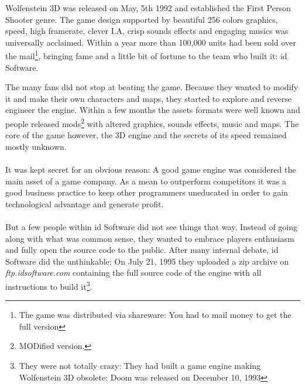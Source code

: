 Wolfenstein 3D was released on May, 5th 1992 and established the First Person Shooter genre. The game design supported by beautiful 256 colors graphics, speed, high framerate, clever I.A, crisp sounds effects and engaging musics was universally acclaimed. Within a year more than 100,000 units had been sold over the mail\footnote{The game was distributed via shareware: You had to mail money to get the full version}, bringing fame and a little bit of fortune to the team who built it: id Software.\\
\par
\begin{figure}[H]
\centering
{}
\end{figure}
\par
The many fans did not stop at beating the game. Because they wanted to modify it and make their own characters and maps, they started to explore and reverse engineer the engine. Within a few months the assets formats were well known and people released mods\footnote{MODified version.} with altered graphics, sounds effects, music and maps. The core of the game however, the 3D engine and the secrets of its speed remained mostly unknown.\\
\\
It was kept secret for an obvious reason: A good game engine was considered the main asset of a game company. As a mean to outperform competitors it was a good business practice to keep other programmers  uneducated in order to gain technological advantage and generate profit.\\
\\
But a few people within id Software did not see things that way. Instead of going along with what was common sense, they wanted to embrace players enthusiasm and fully open the source code to the public. After many internal debate, id Software did the unthinkable: On July 21, 1995 they uploaded a zip archive on \emph{ftp.idsoftware.com} containing the full source code of the engine with all instructions to build it\footnote{They were not totally crazy: They had built a game engine making Wolfenstein 3D obsolete: Doom was released on December 10, 1993}.\\

